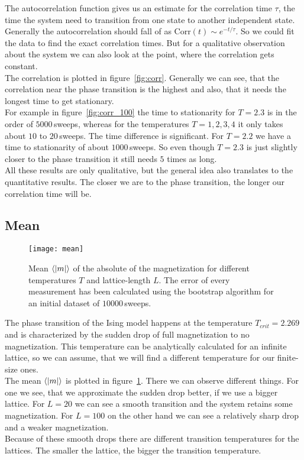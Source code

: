 The autocorrelation function gives us an estimate for the correlation time $\tau$, the time the system need to transition from one state to another independent state. Generally the autocorrelation should fall of as Corr$(t) \sim e^{-t/\tau}$. So we could fit the data to find the exact correlation times. But for a qualitative observation about the system we can also look at the point, where the correlation gets constant.\\
The correlation is plotted in figure~\ref{fig:corr}. Generally we can see, that the correlation near the phase transition is the highest and also, that it needs the longest time to get stationary.\\
For example in figure~\ref{fig:corr_100} the time to stationarity for $T=2.3$ is in the order of $5000\, $sweeps, whereas for the temperatures $T=1, 2, 3, 4$ it only takes about $10$ to $20\,$sweeps. The time difference is significant. For $T=2.2$ we have a time to stationarity of about $1000 \,$sweeps. So even though $T=2.3$ is just slightly closer to the phase transition it still needs $5$ times as long.\\
All these results are only qualitative, but the general idea also translates to the quantitative results. The closer we are to the phase transition, the longer our correlation time will be.


\subsection{Mean}

\begin{figure}
  \centering
  \texttt{[image: mean]}
  \caption{Mean $\left\langle\left\vert m \right\vert\right\rangle$ of the absolute of the  magnetization for different temperatures $T$ and lattice-length $L$. The error of every measurement has been calculated using the bootstrap algorithm for an initial dataset of $10000\,$sweeps.}\label{fig:mean}
\end{figure}

The phase transition of the Ising model happens at the temperature $T_{crit} = 2.269$ and is characterized by the sudden drop of full magnetization to no magnetization. This temperature can be analytically calculated for an infinite lattice, so we can assume, that we will find a different temperature for our finite-size ones.\\
The mean $\left\langle\left\vert m \right\vert\right\rangle$ is plotted in figure~\ref{fig:mean}. There we can observe different things. For one we see, that we approximate the sudden drop better, if we use a bigger lattice. For $L=20$ we can see a smooth transition and the system retains some magnetization. For $L=100$ on the other hand we can see a relatively sharp drop and a weaker magnetization.\\
Because of these smooth drops there are different transition temperatures for the lattices. The smaller the lattice, the bigger the transition temperature.\\

